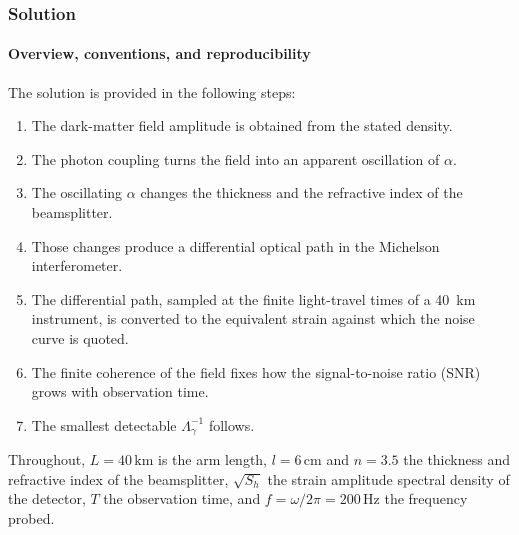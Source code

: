 \providecommand{\citep}[2][]{\cite{#2}}
\providecommand{\citet}[2][]{\cite{#2}}
\providecommand{\citealt}[2][]{\cite{#2}}
\providecommand{\nat}{Nature}
\providecommand{\prl}{Physical Review Letters}
\providecommand{\prd}{Physical Review D}
\providecommand{\pra}{Physical Review A}

\subsubsection*{Solution}

\paragraph*{Overview, conventions, and reproducibility}
The solution is provided in the following steps:
%
\begin{enumerate}[label=Step~\arabic*:,leftmargin=*,align=left,labelsep=0.5em,parsep=0pt,itemsep=0.1em,topsep=0.2em]
    \item The dark-matter field amplitude is obtained from the stated density.
    \item The photon coupling turns the field into an apparent oscillation of $\alpha$.
    \item The oscillating $\alpha$ changes the thickness and the refractive index of the beamsplitter.
    \item Those changes produce a differential optical path in the Michelson interferometer.
    \item The differential path, sampled at the finite light-travel times of a 40~km instrument, is converted to the equivalent strain against which the noise curve is quoted.
    \item The finite coherence of the field fixes how the signal-to-noise ratio (SNR) grows with observation time.
    \item The smallest detectable $\Lambda_\gamma^{-1}$ follows.
\end{enumerate}
%
Throughout, $L=40\,\mathrm{km}$ is the arm length, $l=6\,\mathrm{cm}$ and $n=3.5$ the thickness and refractive index of the beamsplitter, $\sqrt{S_h}$ the strain amplitude spectral density of the detector, $T$ the observation time, and $f=\omega/2\pi=200\,\mathrm{Hz}$ the frequency probed.

